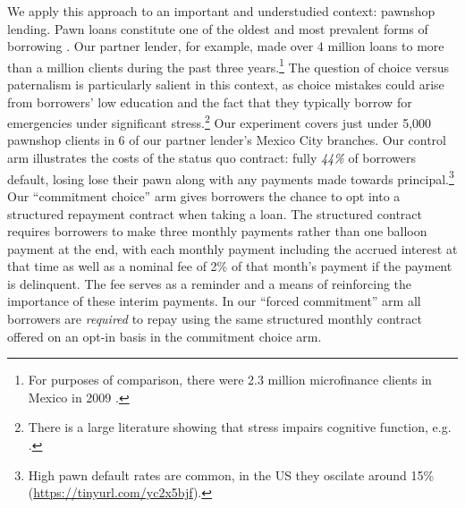 \documentclass[ecta,nameyear,final]{econsocart}
\begin{document}
We apply this approach to an important and understudied context: pawnshop lending. 
Pawn loans constitute one of the oldest and most prevalent forms of borrowing \citep{carter2012pawnshops}.
Our partner lender, for example, made over 4 million loans to more than a million clients during the past three years.\footnote{For purposes of comparison, there were 2.3 million microfinance clients in Mexico in 2009 \citep{Pedroza:2010}.} 
The question of choice versus paternalism is particularly salient in this context, as choice mistakes could arise from borrowers' low education and the fact that they typically borrow for emergencies under significant stress.\footnote{There is a large literature showing that stress impairs cognitive function, e.g. \cite{StressReview}.}
Our experiment covers just under 5,000 pawnshop clients in 6 of our partner lender's Mexico City branches. Our control arm illustrates the costs of the status quo contract: fully \emph{44\%} of borrowers default, losing lose their pawn along with any payments made towards principal.\footnote{High pawn default rates are common, in the US they oscilate around 15\% (\url{https://tinyurl.com/yc2x5bjf}).} Our ``commitment choice'' arm gives borrowers the chance to opt into a structured repayment contract when taking a loan. The structured contract requires borrowers to make three monthly payments rather than one balloon payment at the end, with each monthly payment including the accrued interest at that time as well as a nominal fee of 2\% of that month's payment if the payment is delinquent. The fee serves as a reminder and a means of reinforcing the importance of these interim payments. In our ``forced commitment'' arm all borrowers are \emph{required} to repay using the same structured monthly contract offered on an opt-in basis in the commitment choice arm. 
\end{document}
